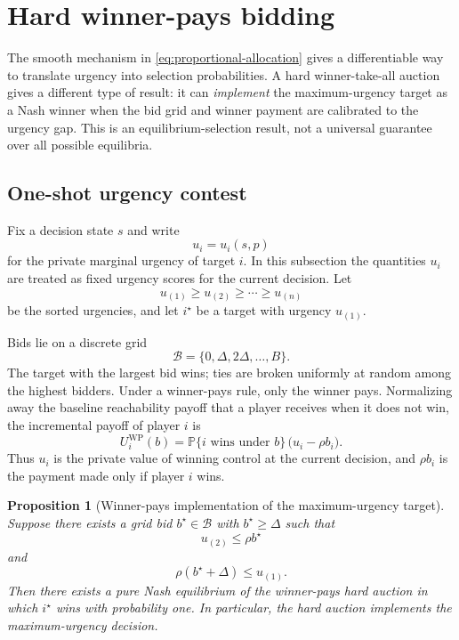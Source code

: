 \documentclass[11pt]{article}
\newtheorem{proposition}{Proposition}
\newcommand{\Prb}{\mathbb{P}}
\begin{document}
\section{Hard winner-pays bidding}
\label{sec:winner-pays}

The smooth mechanism in \eqref{eq:proportional-allocation} gives a differentiable way to translate urgency into
selection probabilities. A hard winner-take-all auction gives a different type of result: it can \emph{implement} the
maximum-urgency target as a Nash winner when the bid grid and winner payment are calibrated to the urgency gap.
This is an equilibrium-selection result, not a universal guarantee over all possible equilibria.

\subsection{One-shot urgency contest}
Fix a decision state $s$ and write
\begin{equation}
  u_i = u_i(s,p)
  \label{eq:hard-u-i}
\end{equation}
for the private marginal urgency of target $i$. In this subsection the quantities $u_i$ are treated as fixed urgency
scores for the current decision. Let
\begin{equation}
  u_{(1)}\ge u_{(2)}\ge \cdots \ge u_{(n)}
  \label{eq:sorted-urgencies}
\end{equation}
be the sorted urgencies, and let $i^\star$ be a target with urgency $u_{(1)}$.

Bids lie on a discrete grid
\begin{equation}
  \mathcal B=\{0,\Delta,2\Delta,\dots,B\}.
  \label{eq:hard-bid-grid}
\end{equation}
The target with the largest bid wins; ties are broken uniformly at random among the highest bidders. Under a
winner-pays rule, only the winner pays. Normalizing away the baseline reachability payoff that a player receives when
it does not win, the incremental payoff of player $i$ is
\begin{equation}
  U_i^{\mathrm{WP}}(b)
  =
  \Prb\{i\text{ wins under }b\}\,\bigl(u_i-\rho b_i\bigr).
  \label{eq:winner-pays-utility}
\end{equation}
Thus $u_i$ is the private value of winning control at the current decision, and $\rho b_i$ is the payment made only if
player $i$ wins.

\begin{proposition}[Winner-pays implementation of the maximum-urgency target]
\label{prop:winner-pays-implementation}
Suppose there exists a grid bid $b^\star\in\mathcal B$ with $b^\star\ge \Delta$ such that
\begin{equation}
  u_{(2)} \le \rho b^\star
  \label{eq:wp-deter-losers}
\end{equation}
and
\begin{equation}
  \rho(b^\star+\Delta) \le u_{(1)}.
  \label{eq:wp-no-lower}
\end{equation}
Then there exists a pure Nash equilibrium of the winner-pays hard auction in which $i^\star$ wins with probability
one. In particular, the hard auction implements the maximum-urgency decision.
\end{proposition}
\end{document}
